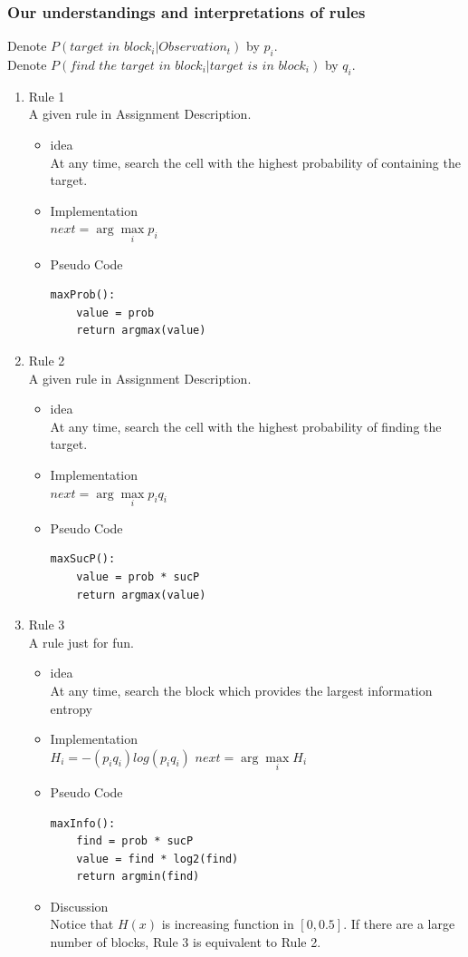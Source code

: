 \documentclass[letter]{article}
\begin{document}
\subsubsection{Our understandings and interpretations of rules}
Denote $P(target\,\, in \,\, block_i|Observation_t)$ by $p_i$. \\
Denote $P(find\,\, the\,\, target\,\, in\,\, block_i|target\,\, is\,\, in\,\, block_i)$ by $q_i$.
\begin{enumerate}
	\item {Rule 1} \\
	A given rule in Assignment Description.
	\begin{itemize}
		\item {idea} \\
		At any time, search the cell with the highest probability of containing the target.
		\item {Implementation} \\
		$next = \arg\max\limits_i p_i$
		\item {Pseudo Code} 
		\begin{lstlisting}
maxProb():
	value = prob
	return argmax(value)
		\end{lstlisting}
	\end{itemize}
	
	\item {Rule 2} \\
	A given rule in Assignment Description.
	\begin{itemize}
		\item {idea} \\
		At any time, search the cell with the highest probability of finding the target.
		\item {Implementation} \\
		$next = \arg\max\limits_i p_iq_i$
		\item {Pseudo Code} 
		\begin{lstlisting}
maxSucP():
	value = prob * sucP
	return argmax(value)   
		\end{lstlisting}
	\end{itemize}

	\item {Rule 3} \\
	A rule just for fun.
	\begin{itemize}
		\item {idea} \\
		At any time, search the block which provides the largest information entropy
		\item {Implementation} \\
		$H_i = -(p_iq_i)log(p_iq_i)$ $next = \arg\max\limits_i H_i$
		\item {Pseudo Code} 
		\begin{lstlisting}
maxInfo():
	find = prob * sucP
	value = find * log2(find)
	return argmin(find)
		\end{lstlisting}
		\item {Discussion} \\
		Notice that $H(x)$ is increasing function in $[0, 0.5]$. If there are a large number of blocks, Rule 3 is equivalent to Rule 2.
	\end{itemize}
\end{enumerate}
\end{document}
